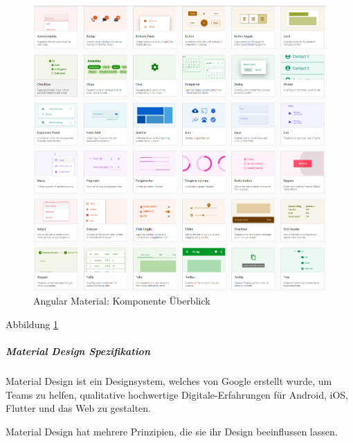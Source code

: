 \begin{figure}
    \centering
    \includegraphics[scale=0.5]{pics/AngularMaterialsComponentsOverview.png}
    \caption{Angular Material: Komponente Überblick}
    \label{fig:impl:angular-material-overview-components}
\end{figure}
Abbildung \ref{fig:impl:angular-material-overview-components} \cite{AngularComponents}

\subparagraph{Material Design Spezifikation}
Material Design ist ein Designsystem, welches von Google erstellt wurde, um Teams zu helfen, qualitative hochwertige Digitale-Erfahrungen für Android, iOS, Flutter und das Web zu gestalten.

Material Design hat mehrere Prinzipien, die sie ihr Design beeinflussen lassen.

